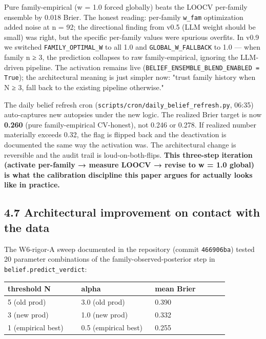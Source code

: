\documentclass[11pt,a4paper]{article}
\begin{document}
Pure family-empirical (w = 1.0 forced globally) beats the LOOCV per-family ensemble by 0.018 Brier. The honest reading: per-family \texttt{w\_fam} optimization added noise at n = 92; the directional finding from v0.5 (LLM weight should be small) was right, but the specific per-family values were spurious overfits. In v0.9 we switched \texttt{FAMILY\_OPTIMAL\_W} to all 1.0 and \texttt{GLOBAL\_W\_FALLBACK} to 1.0 — when family n ≥ 3, the prediction collapses to raw family-empirical, ignoring the LLM-driven pipeline. The activation remains live (\texttt{BELIEF\_ENSEMBLE\_BLEND\_ENABLED = True}); the architectural meaning is just simpler now: "trust family history when N ≥ 3, fall back to the existing pipeline otherwise."

The daily belief refresh cron (\texttt{scripts/cron/daily\_belief\_refresh.py}, 06:35) auto-captures new autopsies under the new logic. The realized Brier target is now \textbf{0.260} (pure family-empirical CV-honest), not 0.246 or 0.278. If realized number materially exceeds 0.32, the flag is flipped back and the deactivation is documented the same way the activation was. The architectural change is reversible and the audit trail is loud-on-both-flips. \textbf{This three-step iteration (activate per-family → measure LOOCV → revise to w = 1.0 global) is what the calibration discipline this paper argues for actually looks like in practice.}

\subsection{4.7 Architectural improvement on contact with the data}

The W6-rigor-A sweep documented in the repository (commit \texttt{466906ba}) tested 20 parameter combinations of the family-observed-posterior step in \texttt{belief.predict\_verdict}:

\begin{center}
\small
\begin{tabular}{p{0.317\linewidth}p{0.317\linewidth}p{0.317\linewidth}}
\toprule
\textbf{threshold N} & \textbf{alpha} & \textbf{mean Brier} \\
\midrule
5 (old prod) & 3.0 (old prod) & 0.390 \\
3 (new prod) & 1.0 (new prod) & 0.332 \\
1 (empirical best) & 0.5 (empirical best) & 0.255 \\
\bottomrule
\end{tabular}
\end{center}
\end{document}
